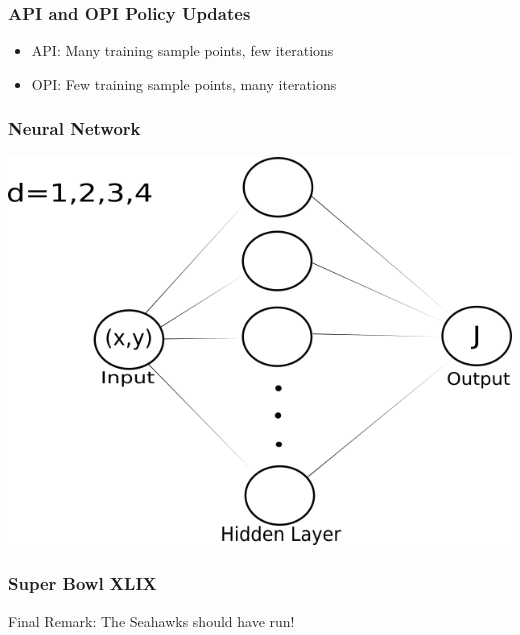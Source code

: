 \documentclass{beamer}
\begin{document}
\begin{frame}
\frametitle{API and OPI Policy Updates}
\begin{itemize}
\item API: Many training sample points, few iterations
\item OPI: Few training sample points, many iterations

\end{itemize}
\end{frame}

\begin{frame}
\frametitle{Neural Network}
\includegraphics[scale=0.4]{neuralnet}
\end{frame}

\begin{frame}\frametitle{Super Bowl XLIX}
\begin{center}
Final Remark: The Seahawks should have run!
\end{center}
\end{frame}
\end{document}
